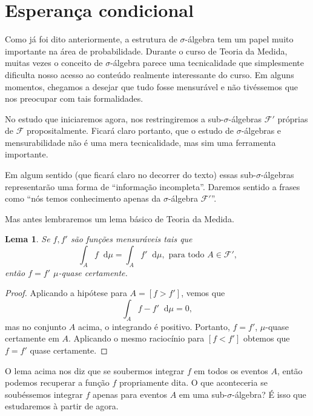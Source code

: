 \documentclass[reqno, draft]{book}
\newcommand*\1{\mathds{1}}
\newtheorem{lemma}[theorem]{Lema}
\renewcommand*\d{\mathop{}\!\mathrm{d}}
\begin{document}
\section{Esperança condicional}

Como já foi dito anteriormente, a estrutura de $\sigma$-álgebra tem um papel muito importante na área de probabilidade.
Durante o curso de Teoria da Medida, muitas vezes o conceito de $\sigma$-álgebra parece uma tecnicalidade que simplesmente dificulta nosso acesso ao conteúdo realmente interessante do curso.
Em alguns momentos, chegamos a desejar que tudo fosse mensurável e não tivéssemos que nos preocupar com tais formalidades.

No estudo que iniciaremos agora, nos restringiremos a sub-$\sigma$-álgebras $\mathcal{F}'$ próprias de $\mathcal{F}$ propositalmente.
Ficará claro portanto, que o estudo de $\sigma$-álgebras e mensurabilidade não é uma mera tecnicalidade, mas sim uma ferramenta importante.

Em algum sentido (que ficará claro no decorrer do texto) essas sub-$\sigma$-ál\-ge\-bras representarão uma forma de ``informação incompleta''.
Daremos sentido a frases como ``nós temos conhecimento apenas da $\sigma$-álgebra $\mathcal{F}'$''.

Mas antes lembraremos um lema básico de Teoria da Medida.

\begin{lemma}
  \label{l:f_igual_fp}
  Se $f, f'$ são funções mensuráveis tais que
  \begin{equation}
    \int_A f \d \mu = \int_A f' \d \mu, \text{ para todo $A \in \mathcal{F}'$,}
  \end{equation}
  então $f = f'$ $\mu$-quase certamente.
\end{lemma}

\begin{proof}
  Aplicando a hipótese para $A = [f > f']$, vemos que
  \begin{equation}
    \int_A f - f' \d \mu = 0,
  \end{equation}
  mas no conjunto $A$ acima, o integrando é positivo.
  Portanto, $f = f'$, $\mu$-quase certamente em $A$.
  Aplicando o mesmo raciocínio para $[f < f']$ obtemos que $f = f'$ quase certamente.
\end{proof}

O lema acima nos diz que se soubermos integrar $f$ em todos os eventos $A$, então podemos recuperar a função $f$ propriamente dita.
O que aconteceria se soubéssemos integrar $f$ apenas para eventos $A$ em uma sub-$\sigma$-álgebra?
É isso que estudaremos à partir de agora.
\end{document}
